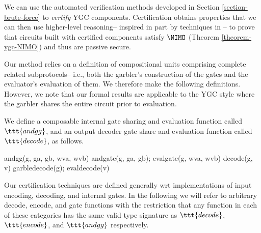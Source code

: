 We can use the automated verification methods developed in Section
\ref{section-brute-force} to \emph{certify} YGC
components. Certification obtains properties that we can then use
higher-level reasoning-- inspired in part by techniques in
\cite{barthe2019probabilistic}-- to prove that circuits built with
certified components satisfy $\NIMO$ (Theorem \ref{theorem-ygc-NIMO})
and thus are passive secure.

Our method relies on a definition of compositional units comprising
complete related subprotocols-- i.e., both the garbler's
construction of the gates and the evaluator's evaluation of them. We
therefore make the following definitions. However, we note that our
formal results are applicable to the YGC style where the garbler
shares the entire circuit prior to evaluation.
\begin{definition}
  \label{ygc-modules}
  We define a composable internal  gate sharing and evaluation function
  called $\ttt{andgg}$, and an output decoder gate share and evaluation function called
  $\ttt{decode}$, as follows. 
\begin{verbatimtab}
  andgg(g, ga, gb, wva, wvb) { andgate(g, ga, gb); evalgate(g, wva, wvb) }
  decode(g, v) { garbledecode(g); evaldecode(v) }
\end{verbatimtab}
\end{definition}

Our certification techniques are defined generally wrt implementations
of input encoding, decoding, and internal gates. In the following we
will refer to arbitrary decode, encode, and gate functions with the
restriction that any function in each of these categories has the same
valid type signature as $\ttt{decode}$, $\ttt{encode}$, and
$\ttt{andgg}$ respectively.

